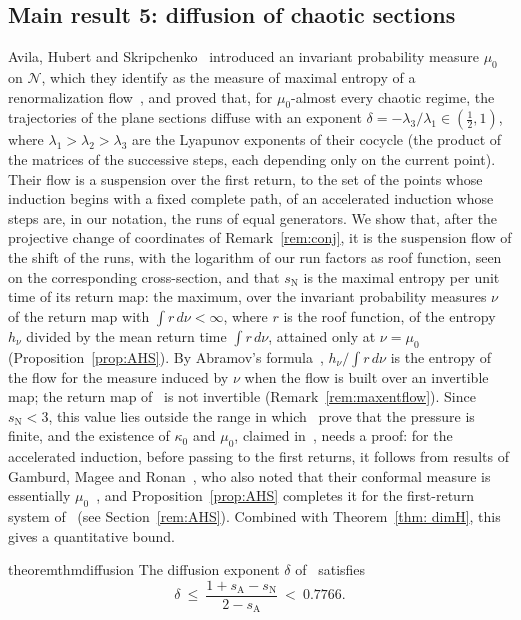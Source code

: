 \documentclass[11pt]{amsart}
\theoremstyle{definition}
\theoremstyle{remark}
\newcommand{\cN}{\mathcal N}
\newcommand{\sN}{s_{\mathrm N}}
\newcommand{\sA}{s_{\mathrm A}}
\begin{document}
\subsection*{Main result 5: diffusion of chaotic sections}
Avila, Hubert and Skripchenko~\cite{AHSinv} introduced an invariant probability measure $\mu_0$ on $\cN$, which they identify as the measure of maximal entropy of a renormalization flow~\cite[Thm.~25]{AHSinv}, and proved that, for $\mu_0$-almost every chaotic regime, the trajectories of the plane sections diffuse with an exponent $\delta=-\lambda_3/\lambda_1\in(\frac12,1)$, where $\lambda_1>\lambda_2>\lambda_3$ are the Lyapunov exponents of their cocycle (the product of the matrices of the successive steps, each depending only on the current point). Their flow is a suspension over the first return, to the set of the points whose induction begins with a fixed complete path, of an accelerated induction whose steps are, in our notation, the runs of equal generators. We show that, after the projective change of coordinates of Remark~\ref{rem:conj}, it is the suspension flow of the shift of the runs, with the logarithm of our run factors as roof function, seen on the corresponding cross-section, and that $\sN$ is the maximal entropy per unit time of its return map: the maximum, over the invariant probability measures $\nu$ of the return map with $\int r\,d\nu<\infty$, where $r$ is the roof function, of the entropy $h_\nu$ divided by the mean return time $\int r\,d\nu$, attained only at $\nu=\mu_0$ (Proposition~\ref{prop:AHS}). By Abramov's formula~\cite{Abr59b}, $h_\nu/\int r\,d\nu$ is the entropy of the flow for the measure induced by $\nu$ when the flow is built over an invertible map; the return map of~\cite{AHSinv} is not invertible (Remark~\ref{rem:maxentflow}).
Since $\sN<3$, this value lies outside the range in which~\cite{AHSinv} prove that the pressure is finite, and the existence of $\kappa_0$ and $\mu_0$, claimed in~\cite[Lemma~24]{AHSinv}, needs a proof: for the accelerated induction, before passing to the first returns, it follows from results of Gamburd, Magee and Ronan~\cite{GMR19}, who also noted that their conformal measure is essentially $\mu_0$~\cite[Remark~12]{GMR19}, and Proposition~\ref{prop:AHS} completes it for the first-return system of~\cite{AHSinv} (see Section~\ref{rem:AHS}).
Combined with Theorem~\ref{thm: dimH}, this gives a quantitative bound.

\begin{restatable}{theorem}{thmdiffusion}\label{cor:diffusion}
The diffusion exponent $\delta$ of~\cite{AHSinv} satisfies
\[
  \delta\ \le\ \frac{1+\sA-\sN}{2-\sA}\ <\ 0.7766 .
\]
\end{restatable}
\end{document}
